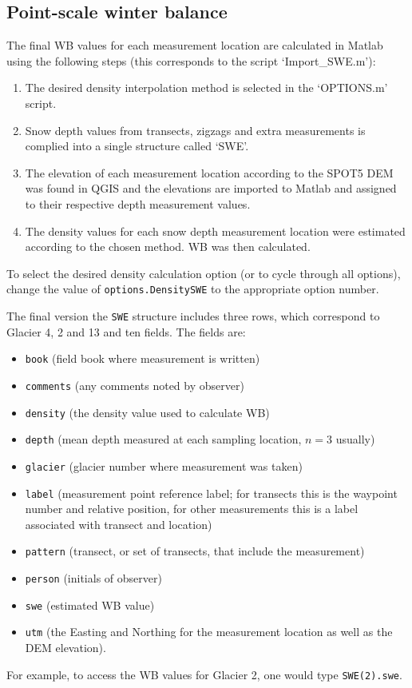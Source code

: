 \documentclass{sfuthesis}
\begin{document}
\begin{appendices}
\section{Point-scale winter balance}

The final WB values for each measurement location are calculated in Matlab using the following steps (this corresponds to the script `Import\_SWE.m'):
\begin{enumerate}
\item The desired density interpolation method is selected in the `OPTIONS.m' script.
\item Snow depth values from transects, zigzags and extra measurements is complied into a single structure called `SWE'.
\item The elevation of each measurement location according to the SPOT5 DEM was found in QGIS and the elevations are imported to Matlab and assigned to their respective depth measurement values.
\item The density values for each snow depth measurement location were estimated according to the chosen method. WB was then calculated. 
\end{enumerate}
To select the desired density calculation option (or to cycle through all options), change the value of \texttt{options.DensitySWE} to the appropriate option number.

The final version the \texttt{SWE} structure includes three rows, which correspond to Glacier 4, 2 and 13 and ten fields. The fields are: 
\begin{itemize}
\item \texttt{book} (field book where measurement is written)
\item \texttt{comments} (any comments noted by observer)
\item \texttt{density} (the density value used to calculate WB)
\item \texttt{depth} (mean depth measured at each sampling location, $n=3$ usually)
\item \texttt{glacier} (glacier number where measurement was taken)
\item \texttt{label} (measurement point reference label; for transects this is the waypoint number and relative position, for other measurements this is a label associated with transect and location)
\item \texttt{pattern} (transect, or set of transects, that include the measurement)
\item \texttt{person} (initials of observer)
\item \texttt{swe} (estimated WB value)
\item \texttt{utm} (the Easting and Northing for the measurement location as well as the DEM elevation). 
\end{itemize}
For example, to access the WB values for Glacier 2, one would type \texttt{SWE(2).swe}. 


\end{appendices}
\end{document}
